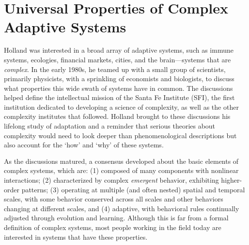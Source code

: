 \documentclass{sig-alternate}
\begin{document}


\section{Universal Properties of Complex Adaptive Systems}

Holland was interested in a broad array of adaptive systems, such as immune
systems, ecologies, financial markets, cities, and the brain---systems
that are \emph{complex}.  In the early 1980s, he teamed up with a small
group of scientists, primarily physicists, with a sprinkling of
economists and biologists, to discuss what properties this wide swath of systems
have in common.  The discussions helped define the intellectual mission
of the Santa Fe Institute (SFI), the first institution dedicated to
developing a science of complexity, as well as the other complexity institutes that followed.
Holland brought to these discussions his lifelong study of
adaptation and a reminder that serious theories about complexity would
need to look deeper than phenomenological descriptions but also
account for the `how' and `why' of these systems.

As the discussions matured, a consensus developed about the basic
elements of complex systems, which are: (1) 
composed of many
components with nonlinear interactions; (2) 
characterized by complex \emph{emergent} behavior, exhibiting
higher-order patterns; (3) 
operating at multiple (and often
nested) spatial and temporal scales, with some behavior 
conserved across all scales and other behaviors changing at different
scales, and (4) 
adaptive, with 
behavioral rules continually adjusted through evolution and learning.  Although this
is far from a formal definition of complex systems, most people
working in the field today are interested in systems that have these
properties.

\end{document}
